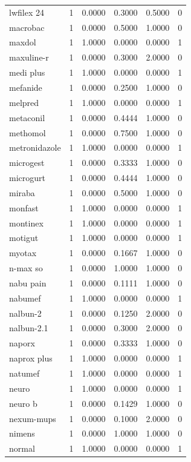 \begin{longtable}{p{3.0cm}rrrrr}
lwfilex 24 & 1 & 0.0000 & 0.3000 & 0.5000 & 0 \\
macrobac & 1 & 0.0000 & 0.5000 & 1.0000 & 0 \\
maxdol & 1 & 1.0000 & 0.0000 & 0.0000 & 1 \\
maxuline-r & 1 & 0.0000 & 0.3000 & 2.0000 & 0 \\
medi plus & 1 & 1.0000 & 0.0000 & 0.0000 & 1 \\
mefanide & 1 & 0.0000 & 0.2500 & 1.0000 & 0 \\
melpred & 1 & 1.0000 & 0.0000 & 0.0000 & 1 \\
metaconil & 1 & 0.0000 & 0.4444 & 1.0000 & 0 \\
methomol & 1 & 0.0000 & 0.7500 & 1.0000 & 0 \\
metronidazole & 1 & 1.0000 & 0.0000 & 0.0000 & 1 \\
microgest & 1 & 0.0000 & 0.3333 & 1.0000 & 0 \\
microgurt & 1 & 0.0000 & 0.4444 & 1.0000 & 0 \\
miraba & 1 & 0.0000 & 0.5000 & 1.0000 & 0 \\
monfast & 1 & 1.0000 & 0.0000 & 0.0000 & 1 \\
montinex & 1 & 1.0000 & 0.0000 & 0.0000 & 1 \\
motigut & 1 & 1.0000 & 0.0000 & 0.0000 & 1 \\
myotax & 1 & 0.0000 & 0.1667 & 1.0000 & 0 \\
n-max so & 1 & 0.0000 & 1.0000 & 1.0000 & 0 \\
nabu pain & 1 & 0.0000 & 0.1111 & 1.0000 & 0 \\
nabumef & 1 & 1.0000 & 0.0000 & 0.0000 & 1 \\
nalbun-2 & 1 & 0.0000 & 0.1250 & 2.0000 & 0 \\
nalbun-2.1 & 1 & 0.0000 & 0.3000 & 2.0000 & 0 \\
naporx & 1 & 0.0000 & 0.3333 & 1.0000 & 0 \\
naprox plus & 1 & 1.0000 & 0.0000 & 0.0000 & 1 \\
natumef & 1 & 1.0000 & 0.0000 & 0.0000 & 1 \\
neuro & 1 & 1.0000 & 0.0000 & 0.0000 & 1 \\
neuro b & 1 & 0.0000 & 0.1429 & 1.0000 & 0 \\
nexum-mups & 1 & 0.0000 & 0.1000 & 2.0000 & 0 \\
nimens & 1 & 0.0000 & 1.0000 & 1.0000 & 0 \\
normal & 1 & 1.0000 & 0.0000 & 0.0000 & 1 \\

\end{longtable}
